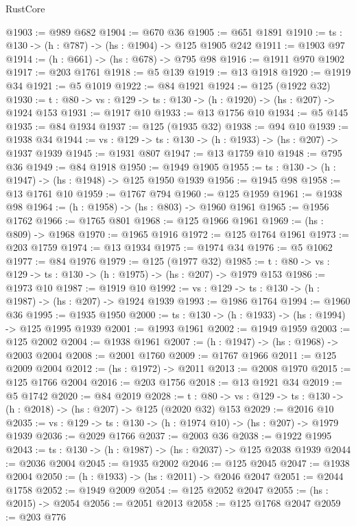 \begin{lexlean}{RustCore}
\begin{coremodule}
@1903 := @989 @682
@1904 := @670 @36
@1905 := @651 @1891
@1910 := {ts : @130} -> (h : @787) -> (hs : @1904) -> @125 @1905 @242
@1911 := @1903 @97
@1914 := (h : @661) -> (hs : @678) -> @795 @98
@1916 := @1911 @970 @1902
@1917 := @203 @1761
@1918 := @5 @139
@1919 := @13 @1918
@1920 := @1919 @34
@1921 := @5 @1019
@1922 := @84 @1921
@1924 := @125 (@1922 @32)
@1930 := {t : @80} -> {vs : @129} -> {ts : @130} -> (h : @1920) -> (hs : @207) -> @1924 @153
@1931 := @1917 @10
@1933 := @13 @1756 @10
@1934 := @5 @145
@1935 := @84 @1934
@1937 := @125 (@1935 @32)
@1938 := @94 @10
@1939 := @1938 @34
@1944 := {vs : @129} -> {ts : @130} -> (h : @1933) -> (hs : @207) -> @1937 @1939
@1945 := @1931 @807
@1947 := @13 @1759 @10
@1948 := @795 @36
@1949 := @84 @1918
@1950 := @1949 @1905
@1955 := {ts : @130} -> (h : @1947) -> (hs : @1948) -> @125 @1950 @1939
@1956 := @1945 @98
@1958 := @13 @1761 @10
@1959 := @1767 @794
@1960 := @125 @1959
@1961 := @1938 @98
@1964 := (h : @1958) -> (hs : @803) -> @1960 @1961
@1965 := @1956 @1762
@1966 := @1765 @801
@1968 := @125 @1966 @1961
@1969 := (hs : @809) -> @1968
@1970 := @1965 @1916
@1972 := @125 @1764 @1961
@1973 := @203 @1759
@1974 := @13 @1934
@1975 := @1974 @34
@1976 := @5 @1062
@1977 := @84 @1976
@1979 := @125 (@1977 @32)
@1985 := {t : @80} -> {vs : @129} -> {ts : @130} -> (h : @1975) -> (hs : @207) -> @1979 @153
@1986 := @1973 @10
@1987 := @1919 @10
@1992 := {vs : @129} -> {ts : @130} -> (h : @1987) -> (hs : @207) -> @1924 @1939
@1993 := @1986 @1764
@1994 := @1960 @36
@1995 := @1935 @1950
@2000 := {ts : @130} -> (h : @1933) -> (hs : @1994) -> @125 @1995 @1939
@2001 := @1993 @1961
@2002 := @1949 @1959
@2003 := @125 @2002
@2004 := @1938 @1961
@2007 := (h : @1947) -> (hs : @1968) -> @2003 @2004
@2008 := @2001 @1760
@2009 := @1767 @1966
@2011 := @125 @2009 @2004
@2012 := (hs : @1972) -> @2011
@2013 := @2008 @1970
@2015 := @125 @1766 @2004
@2016 := @203 @1756
@2018 := @13 @1921 @34
@2019 := @5 @1742
@2020 := @84 @2019
@2028 := {t : @80} ->
  {vs : @129} -> {ts : @130} -> (h : @2018) -> (hs : @207) -> @125 (@2020 @32) @153
@2029 := @2016 @10
@2035 := {vs : @129} -> {ts : @130} -> (h : @1974 @10) -> (hs : @207) -> @1979 @1939
@2036 := @2029 @1766
@2037 := @2003 @36
@2038 := @1922 @1995
@2043 := {ts : @130} -> (h : @1987) -> (hs : @2037) -> @125 @2038 @1939
@2044 := @2036 @2004
@2045 := @1935 @2002
@2046 := @125 @2045
@2047 := @1938 @2004
@2050 := (h : @1933) -> (hs : @2011) -> @2046 @2047
@2051 := @2044 @1758
@2052 := @1949 @2009
@2054 := @125 @2052 @2047
@2055 := (hs : @2015) -> @2054
@2056 := @2051 @2013
@2058 := @125 @1768 @2047
@2059 := @203 @776

\end{coremodule}
\end{lexlean}
